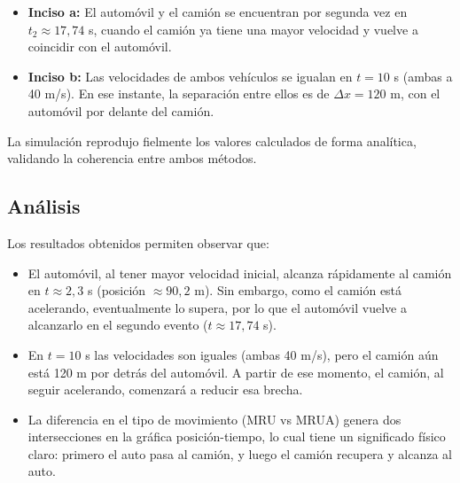 \begin{itemize}
    \item \textbf{Inciso a:} El automóvil y el camión se encuentran por segunda vez en $t_2 \approx 17{,}74$ s, cuando el camión ya tiene una mayor velocidad y vuelve a coincidir con el automóvil.
    \item \textbf{Inciso b:} Las velocidades de ambos vehículos se igualan en $t = 10$ s (ambas a 40 m/s). En ese instante, la separación entre ellos es de $\Delta x = 120$ m, con el automóvil por delante del camión.
\end{itemize}

La simulación reprodujo fielmente los valores calculados de forma analítica, validando la coherencia entre ambos métodos.

\subsection{Análisis}

Los resultados obtenidos permiten observar que:

\begin{itemize}
    \item El automóvil, al tener mayor velocidad inicial, alcanza rápidamente al camión en $t \approx 2{,}3$ s (posición $\approx 90{,}2$ m). Sin embargo, como el camión está acelerando, eventualmente lo supera, por lo que el automóvil vuelve a alcanzarlo en el segundo evento ($t \approx 17{,}74$ s).
    \item En $t = 10$ s las velocidades son iguales (ambas 40 m/s), pero el camión aún está 120 m por detrás del automóvil. A partir de ese momento, el camión, al seguir acelerando, comenzará a reducir esa brecha.
    \item La diferencia en el tipo de movimiento (MRU vs MRUA) genera dos intersecciones en la gráfica posición-tiempo, lo cual tiene un significado físico claro: primero el auto pasa al camión, y luego el camión recupera y alcanza al auto.
\end{itemize}